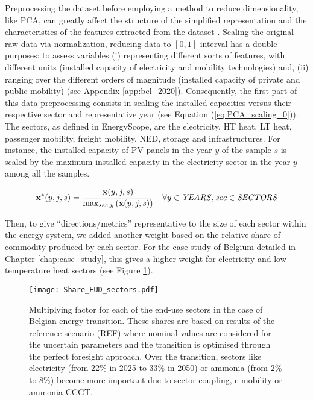 \noindent
Preprocessing the dataset before employing a method to reduce dimensionality, like \gls{PCA}, can greatly affect the structure of the simplified representation and the characteristics of the features extracted from the dataset \cite{parente2013principal,peerenboom2015dimension}. Scaling the original raw data via normalization, \ie reducing data to $[0, 1]$ interval has a double purposes: to assess variables (i) representing different sorts of features, with different units (\eg installed capacity of electricity and mobility technologies) and, (ii) ranging over the different orders of magnitude (\eg installed capacity of private and public mobility) (see Appendix \ref{app:bel_2020}).  Consequently, the first part of this data preprocessing consists in scaling the installed capacities versus their respective sector and representative year (see Equation (\ref{eq:PCA_scaling_0})). The sectors, as defined in EnergyScope, are the electricity, \gls{HT} heat, \gls{LT} heat, passenger mobility, freight mobility, \gls{NED}, storage and infrastructures. For instance, the installed capacity of \gls{PV} panels in the year $y$ of the sample $s$ is scaled by the maximum installed capacity in the electricity sector in the year $y$ among all the samples.

\begin{equation}
 \label{eq:PCA_scaling_0}
\textbf{x}^{*}(y,j,s)=\frac{\textbf{x}(y,j,s)}{\mathrm{max}_{sec,y}\left(\textbf{x}(y,j,s)\right)}
 \quad \forall y \in \text{\emph{YEARS}}, sec \in \text{\emph{SECTORS}}
\end{equation}

Then, to give ``directions/metrics'' representative to the size of each sector within the energy system, we added another weight based on the relative share of commodity produced by each sector. For the case study of Belgium detailed in Chapter \ref{chap:case_study}, this gives a higher weight for electricity and low-temperature heat sectors (see Figure \ref{fig:Share_EUD_sectors}). 

\begin{figure}[!htbp]
\centering
\texttt{[image: Share\_EUD\_sectors.pdf]}
\caption{Multiplying factor for each of the end-use sectors in the case of Belgian energy transition. These shares are based on results of the reference scenario (REF) where nominal values are considered for the uncertain parameters and the transition is optimised through the perfect foresight approach. Over the transition, sectors like electricity (\ie from 22\% in 2025 to 33\% in 2050) or ammonia (\ie from 2\% to 8\%) become more important due to sector coupling, \eg e-mobility or ammonia-\gls{CCGT}.}
\label{fig:Share_EUD_sectors}
\end{figure}

